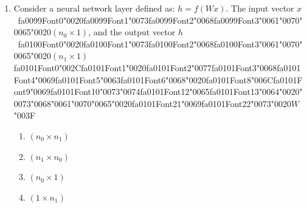 \documentclass[12pt]{article}
\begin{document}
\begin{enumerate}[label=Q\arabic*.]
\begin{enumerate}[label=(\Alph*)]
    \item All future inputs
\end{enumerate}
\item Consider a neural network layer defined as: $h = f(Wx)$. The input vector $x$\ {\csname fa0099Font0\endcsname\char"0020}{\csname fa0099Font1\endcsname\char"0073}{\csname fa0099Font2\endcsname\char"0068}{\csname fa0099Font3\endcsname\char"0061}{\char"0070}{\char"0065}{\char"0020}$(n_0 \times 1)$, and the output vector $h$\ {\csname fa0100Font0\endcsname\char"0020}{\csname fa0100Font1\endcsname\char"0073}{\csname fa0100Font2\endcsname\char"0068}{\csname fa0100Font3\endcsname\char"0061}{\char"0070}{\char"0065}{\char"0020}$(n_1 \times 1)${\csname fa0101Font0\endcsname\char"002C}{\csname fa0101Font1\endcsname\char"0020}{\csname fa0101Font2\endcsname\char"0077}{\csname fa0101Font3\endcsname\char"0068}{\csname fa0101Font4\endcsname\char"0069}{\csname fa0101Font5\endcsname\char"0063}{\csname fa0101Font6\endcsname\char"0068}{\char"0020}{\csname fa0101Font8\endcsname\char"006C}{\csname fa0101Font9\endcsname\char"0069}{\csname fa0101Font10\endcsname\char"0073}{\char"0074}{\csname fa0101Font12\endcsname\char"0065}{\csname fa0101Font13\endcsname\char"0064}{\char"0020}{\char"0073}{\char"0068}{\char"0061}{\char"0070}{\char"0065}{\char"0020}{\csname fa0101Font21\endcsname\char"0069}{\csname fa0101Font22\endcsname\char"0073}{\char"0020}$W${\char"003F}
\begin{enumerate}[label=(\Alph*)]
    \item $(n_0 \times n_1)$
    \item $(n_1 \times n_0)$
    \item $(n_0 \times 1)$
    \item $(1 \times n_1)$
\end{enumerate}

\end{enumerate}
\end{document}
